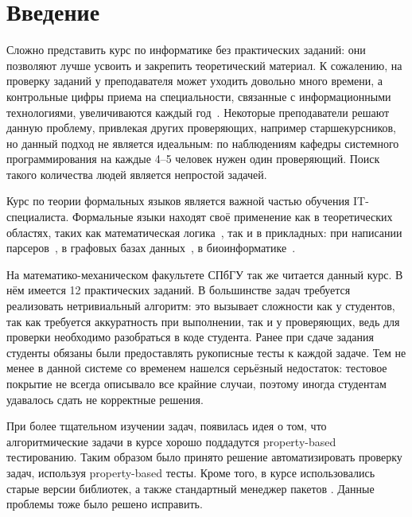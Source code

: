 
\section*{Введение}
\thispagestyle{withCompileDate}

Сложно представить курс по информатике без практических заданий: они позволяют лучше усвоить и закрепить теоретический материал.
К сожалению, на проверку заданий у преподавателя может уходить довольно много времени, а контрольные цифры приема на специальности, связанные с информационными технологиями, увеличиваются каждый год~\cite{2024GoduKolichestvo}.
Некоторые преподаватели решают данную проблему, привлекая других проверяющих, например старшекурсников, но данный подход не является идеальным: по наблюдениям кафедры системного программирования на каждые 4--5 человек нужен один проверяющий.
Поиск такого количества людей является непростой задачей.

Курс по теории формальных языков является важной частью обучения IT-специалиста.
Формальные языки находят своё применение как в теоретических областях, таких как математическая логика~\cite{guhaParikhAutomataInfinite2022,draghiciSemEnovArithmetic2023a}, так и в прикладных: при написании парсеров~\cite{gruneParsingTechniques2008, scottGLLParsing2010}, в графовых базах данных~\cite{hellingsQueryingPathsGraphs2016,noleRegularPathQueries2016}, в биоинформатике~\cite{dyrkaEstimatingProbabilisticContextfree2019,wjandersonEvolvingStochasticContext2012}.

На математико-механическом факультете СПбГУ так же читается данный курс.
В нём имеется 12 практических заданий.
В большинстве задач требуется реализовать нетривиальный алгоритм: это вызывает сложности как у студентов, так как требуется аккуратность при выполнении, так и у проверяющих, ведь для проверки необходимо разобраться в коде студента.
Ранее при сдаче задания студенты обязаны были предоставлять рукописные тесты к каждой задаче.
Тем не менее в данной системе со временем нашелся серьёзный недостаток: тестовое покрытие не всегда описывало все крайние случаи, поэтому иногда студентам удавалось сдать не корректные решения.

При более тщательном изучении задач, появилась идея о том, что алгоритмические задачи в курсе хорошо поддадутся property-based тестированию.
Таким образом было принято решение автоматизировать проверку задач, используя property-based тесты.
Кроме того, в курсе использовались старые версии библиотек, а также стандартный менеджер пакетов \python{}.
Данные проблемы тоже было решено исправить.
